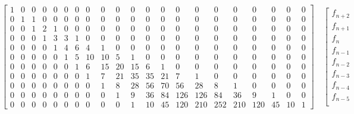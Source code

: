 \documentclass[a4paper,dottedtoc,headinclude,footinclude]{report} %
\theoremstyle{plain}
\begin{document}
    \begin{table}

        \begin{displaymath}
            \left[\begin{array}{ccccccccccccccccccccc}
                1 & 0 & 0 & 0 & 0 & 0 & 0 & 0 & 0 & 0 & 0 & 0 & 0 & 0 & 0 & 0 & 0 & 0 & 0 & 0 & 0\\
                0 & 1 & 1 & 0 & 0 & 0 & 0 & 0 & 0 & 0 & 0 & 0 & 0 & 0 & 0 & 0 & 0 & 0 & 0 & 0 & 0\\
                0 & 0 & 1 & 2 & 1 & 0 & 0 & 0 & 0 & 0 & 0 & 0 & 0 & 0 & 0 & 0 & 0 & 0 & 0 & 0 & 0\\
                0 & 0 & 0 & 1 & 3 & 3 & 1 & 0 & 0 & 0 & 0 & 0 & 0 & 0 & 0 & 0 & 0 & 0 & 0 & 0 & 0\\
                0 & 0 & 0 & 0 & 1 & 4 & 6 & 4 & 1 & 0 & 0 & 0 & 0 & 0 & 0 & 0 & 0 & 0 & 0 & 0 & 0\\
                0 & 0 & 0 & 0 & 0 & 1 & 5 & 10 & 10 & 5 & 1 & 0 & 0 & 0 & 0 & 0 & 0 & 0 & 0 & 0 & 0\\
                0 & 0 & 0 & 0 & 0 & 0 & 1 & 6 & 15 & 20 & 15 & 6 & 1 & 0 & 0 & 0 & 0 & 0 & 0 & 0 & 0\\
                0 & 0 & 0 & 0 & 0 & 0 & 0 & 1 & 7 & 21 & 35 & 35 & 21 & 7 & 1 & 0 & 0 & 0 & 0 & 0 & 0\\
                0 & 0 & 0 & 0 & 0 & 0 & 0 & 0 & 1 & 8 & 28 & 56 & 70 & 56 & 28 & 8 & 1 & 0 & 0 & 0 & 0\\
                0 & 0 & 0 & 0 & 0 & 0 & 0 & 0 & 0 & 1 & 9 & 36 & 84 & 126 & 126 & 84 & 36 & 9 & 1 & 0 & 0\\
                0 & 0 & 0 & 0 & 0 & 0 & 0 & 0 & 0 & 0 & 1 & 10 & 45 & 120 & 210 & 252 & 210 & 120 & 45 & 10 & 1
                \end{array}\right]  \quad %
                \left[
                    \begin{array}{c}
                        f_{n + 2}\\
                        f_{n + 1}\\
                        f_{n}\\
                        f_{n - 1}\\
                        f_{n - 2}\\
                        f_{n - 3}\\
                        f_{n - 4}\\
                        f_{n - 5}\\

\end{array}
\end{displaymath}
\end{table}
\end{document}
